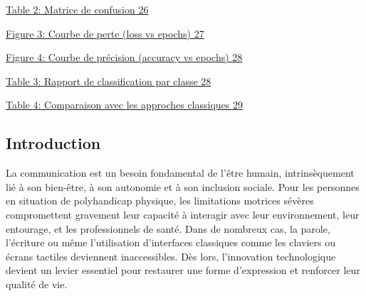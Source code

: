 \documentclass[
]{article}
\begin{document}
\href{/l}{Table 2: Matrice de confusion 26}

\href{/l}{Figure 3: Courbe de perte (loss vs epochs) 27}

\href{/l}{Figure 4: Courbe de précision (accuracy vs epochs) 28}

\href{/l}{Table 3: Rapport de classification par classe 28}

\href{/l}{Table 4: Comparaison avec les approches classiques 29}

\hypertarget{section-21}{%
\subsection{}\label{section-21}}

\hypertarget{section-22}{%
\subsection{}\label{section-22}}

\hypertarget{section-23}{%
\subsection{}\label{section-23}}

\hypertarget{section-24}{%
\subsection{}\label{section-24}}

\hypertarget{section-25}{%
\subsection{}\label{section-25}}

\hypertarget{introduction}{%
\subsection{Introduction}\label{introduction}}

La communication est un besoin fondamental de l'être humain, intrinsèquement lié à son bien-être, à son autonomie et à son inclusion sociale. Pour les personnes en situation de polyhandicap physique, les limitations motrices sévères compromettent gravement leur capacité à interagir avec leur environnement, leur entourage, et les professionnels de santé. Dans de nombreux cas, la parole, l'écriture ou même l'utilisation d'interfaces classiques comme les claviers ou écrans tactiles deviennent inaccessibles. Dès lors, l'innovation technologique devient un levier essentiel pour restaurer une forme d'expression et renforcer leur qualité de vie.
\end{document}
